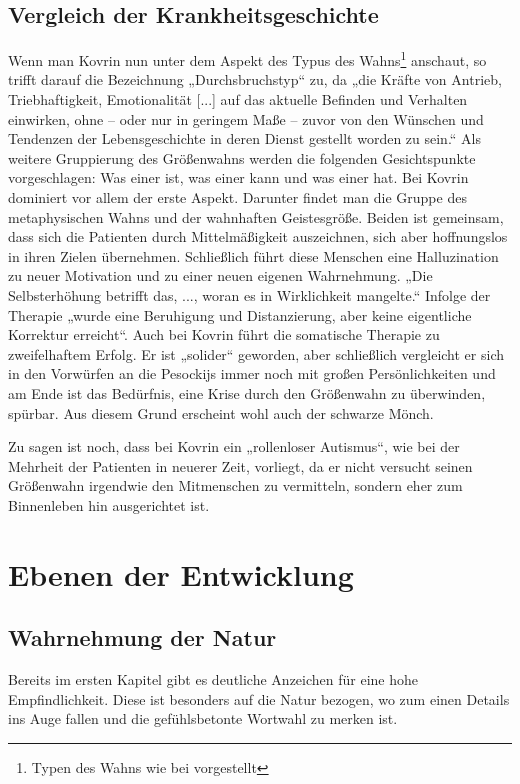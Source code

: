 \documentclass{../../sem_paper}
\begin{document}
\subsection{Vergleich der Krankheitsgeschichte}
Wenn man Kovrin nun unter dem Aspekt des Typus des Wahns\footnote{Typen des Wahns wie bei \autocite{avenarius} vorgestellt} anschaut, so trifft darauf die
Bezeichnung „Durchsbruchstyp“ zu, da „die Kräfte von Antrieb, Triebhaftigkeit, Emotionalität [...]
auf das aktuelle Befinden und Verhalten einwirken, ohne -- oder nur in geringem Maße -- zuvor von
den Wünschen und Tendenzen der Lebensgeschichte in deren Dienst gestellt worden zu sein.“\autocite[73]{avenarius}
Als weitere Gruppierung des Größenwahns werden die folgenden Gesichtspunkte vorgeschlagen:
Was einer ist, was einer kann und was einer hat.\autocite[23]{avenarius} Bei Kovrin dominiert vor allem der erste Aspekt.
Darunter findet man die Gruppe des metaphysischen Wahns und der wahnhaften Geistesgröße.
Beiden ist gemeinsam, dass sich die Patienten durch Mittelmäßigkeit auszeichnen, sich aber
hoffnungslos in ihren Zielen übernehmen. Schließlich führt diese Menschen eine Halluzination zu
neuer Motivation und zu einer neuen eigenen Wahrnehmung. „Die Selbsterhöhung betrifft das, ...,
woran es in Wirklichkeit mangelte.“\autocite[24]{avenarius} Infolge der Therapie „wurde eine Beruhigung und
Distanzierung, aber keine eigentliche Korrektur erreicht“\autocite[24]{avenarius}. Auch bei Kovrin führt die somatische
Therapie zu zweifelhaftem Erfolg. Er ist „solider“ geworden, aber schließlich vergleicht er sich in
den Vorwürfen an die Pesockijs immer noch mit großen Persönlichkeiten und am Ende ist das
Bedürfnis, eine Krise durch den Größenwahn zu überwinden, spürbar. Aus diesem Grund erscheint
wohl auch der schwarze Mönch.

Zu sagen ist noch, dass bei Kovrin ein „rollenloser Autismus“\autocite{avenarius}, wie bei der Mehrheit der Patienten in
neuerer Zeit, vorliegt, da er nicht versucht seinen Größenwahn irgendwie den Mitmenschen zu
vermitteln, sondern eher zum Binnenleben hin ausgerichtet ist.
\section{Ebenen der Entwicklung}
\subsection{Wahrnehmung der Natur}
Bereits im ersten Kapitel gibt es deutliche Anzeichen für eine hohe Empfindlichkeit. Diese ist
besonders auf die Natur bezogen, wo zum einen Details ins Auge fallen und die gefühlsbetonte
Wortwahl zu merken ist.
\end{document}
